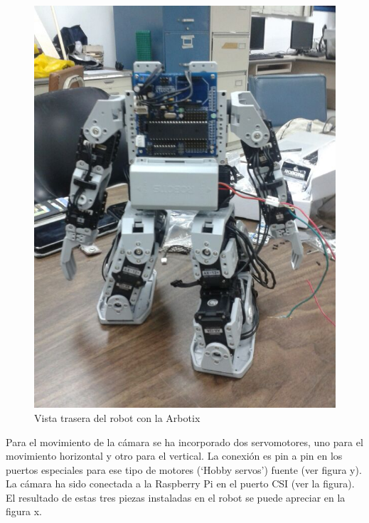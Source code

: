 \begin{figure}[hbtp]
\centering
\includegraphics[scale=0.3]{imagenes/traseroDeJunny.jpg}
\caption{Vista trasera del robot con la Arbotix}
\end{figure}


Para el movimiento de la cámara se ha incorporado dos servomotores, uno para el movimiento horizontal y otro para el vertical. La conexión es pin a pin en los puertos especiales para ese tipo de motores (‘Hobby servos’) fuente (ver figura y). La cámara ha sido conectada a la Raspberry Pi en el puerto CSI (ver la figura). El resultado de estas tres piezas instaladas en el robot se puede apreciar en la figura x.



